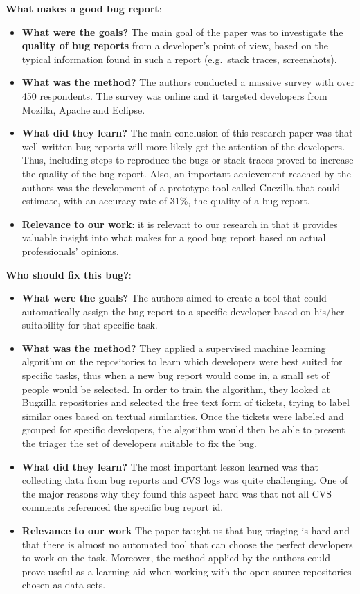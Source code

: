 \documentclass{mprop}
\begin{document}
\textbf{What makes a good bug report}\cite{bettenburg2008makes}:
\begin{itemize}
  \item \textbf{What were the goals?}
  The main goal of the paper was to investigate the \textbf{quality of bug reports} from a developer's
  point of view, based on the typical information found in such a report (e.g.\ stack traces, screenshots).
\item \textbf{What was the method?}
  The authors conducted a massive survey with over 450 respondents. The survey was online and it targeted
  developers from Mozilla, Apache and Eclipse.
\item \textbf{What did they learn?}
  The main conclusion of this research paper was that well written bug reports will more likely get the 
  attention of the developers. Thus, including steps to reproduce the bugs or stack traces proved to increase
  the quality of the bug report. Also, an important achievement reached by the authors was the development of
  a prototype tool called Cuezilla that could estimate, with an accuracy rate of 31\%, the quality of a bug
  report.
\item \textbf{Relevance to our work}: it is relevant to our research in that it provides valuable insight into 
  what makes for a good bug report based on actual professionals' opinions.
\end{itemize}

\textbf{Who should fix this bug?}\cite{anvik2006should}:
\begin{itemize}
  \item \textbf{What were the goals?}
    The authors aimed to create a tool that could automatically assign the 
    bug report to a specific developer based on his/her suitability for that
    specific task.
  \item \textbf{What was the method?}
    They applied a supervised machine learning algorithm on the 
    repositories to learn which developers were best suited for specific tasks,
    thus when a new bug report would come in, a small set of people 
    would be selected. In order to train the algorithm, they looked at
    Bugzilla repositories and selected the free text form of tickets, trying
    to label similar ones based on textual similarities. Once the tickets were 
    labeled and grouped for specific developers, the algorithm would then be
    able to present the triager the set of developers suitable to fix the bug.
  \item \textbf{What did they learn?}
    The most important lesson learned was that collecting data from bug reports 
    and CVS logs was quite challenging. One of the major reasons why they 
    found this aspect hard was that not all CVS comments referenced the 
    specific bug report id.
  \item \textbf{Relevance to our work}
    The paper taught us that bug triaging is hard and that there is almost no 
    automated tool that can choose the perfect developers to work on the task.
    Moreover, the method applied by the authors could prove useful as a 
    learning aid when working with the open source repositories 
    chosen as data sets.
\end{itemize}
\end{document}
